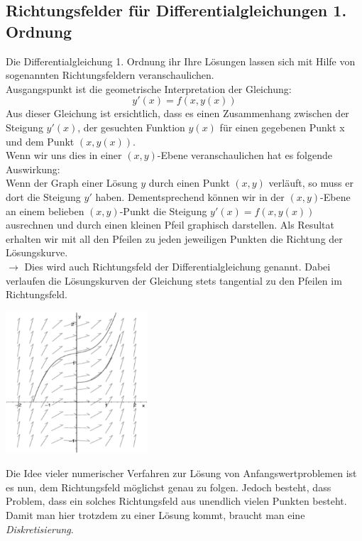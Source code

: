\documentclass{article}
\newenvironment{Figure}
	{\par\medskip\noindent\minipage{\linewidth}}
	{\endminipage\par\medskip}
\theoremstyle{satz}
\theoremstyle{definition}
\begin{document}
\subsection{Richtungsfelder für Differentialgleichungen 1. Ordnung}
Die Differentialgleichung 1. Ordnung ihr Ihre Lösungen lassen sich mit Hilfe von sogenannten Richtungsfeldern veranschaulichen.\\
Ausgangspunkt ist die geometrische Interpretation der Gleichung:
\begin{equation}
y'(x) = f(x, y(x))
\end{equation}
Aus dieser Gleichung ist ersichtlich, dass es einen Zusammenhang zwischen der Steigung $y'(x)$, der gesuchten Funktion $y(x)$ für einen gegebenen Punkt x und dem Punkt $(x,y(x))$.\\
Wenn wir uns dies in einer $(x,y)$-Ebene veranschaulichen hat es folgende Auswirkung:\\
Wenn der Graph einer Lösung $y$ durch einen Punkt $(x,y)$ verläuft, so muss er dort die Steigung $y'$ haben. Dementsprechend können wir in der $(x,y)$-Ebene an einem belieben $(x,y)$-Punkt die Steigung $y'(x) = f(x, y(x))$ ausrechnen und durch einen kleinen Pfeil graphisch darstellen. Als Resultat erhalten wir mit all den Pfeilen zu jeden jeweiligen Punkten die Richtung der Lösungskurve.\\
$\rightarrow$ Dies wird auch Richtungsfeld der Differentialgleichung genannt. Dabei verlaufen die Lösungskurven der Gleichung stets tangential zu den Pfeilen im Richtungsfeld.
\begin{Figure}
\centering
\includegraphics[width=200px]{img/BeispielRichtungsfeld.png}
	\label{fig:Beispiel für ein Richtungsfeld}
\end{Figure}
Die Idee vieler numerischer Verfahren zur Lösung von Anfangswertproblemen ist es nun, dem Richtungsfeld möglichst genau zu folgen. Jedoch besteht, dass Problem, dass ein solches Richtungsfeld aus unendlich vielen Punkten besteht. Damit man hier trotzdem zu einer Lösung kommt, braucht man eine \textit{Diskretisierung}.
\end{document}
